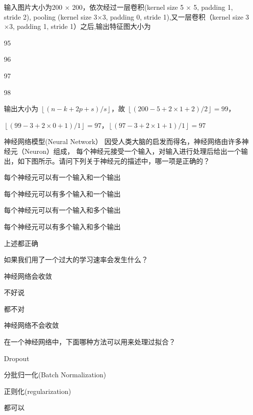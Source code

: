 \documentclass{exam-zh}
\begin{document}
\begin{question}
	输入图片大小为200 $\times$ 200，依次经过一层卷积(kernel size 5 $\times$ 5, padding 1, stride 2), pooling (kernel size 3$\times$3, padding 0, stride 1),又一层卷积（kernel size 3$\times$3, padding 1, stride 1）之后,输出特征图大小为 \paren[C]
  	\begin{choices}
		\item 95
		\item 96
		\item 97
		\item 98
	\end{choices}
	\begin{solution}
		输出大小为 $\left \lfloor (n - k + 2p + s) / s \right \rfloor $，故 $\left \lfloor (200 - 5 + 2 \times 1 + 2) / 2 \right \rfloor = 99$，
		
		$\left \lfloor (99 - 3 + 2 \times 0 + 1) / 1 \right \rfloor = 97$，$\left \lfloor (97 - 3 + 2 \times 1 + 1) / 1 \right \rfloor = 97$
	\end{solution}
\end{question}

\begin{question}
	神经网络模型(Neural Network） 因受人类大脑的启发而得名，神经网络由许多神经元（Neuron）组成， 每个神经元接受一个输入，对输入进行处理后给出一个输出，如下图所示。请问下列关于神经元的描述中，哪一项是正确的？ \paren[E]
	\begin{choices}
		\item 每个神经元可以有一个输入和一个输出
		\item 每个神经元可以有多个输入和一个输出
		\item 每个神经元可以有一个输入和多个输出
		\item 每个神经元可以有多个输入和多个输出
		\item 上述都正确
	\end{choices}
\end{question}


\begin{question}
	如果我们用了一个过大的学习速率会发生什么？ \paren[D]
	\begin{choices}
		\item 神经网络会收敛 
		\item 不好说 
		\item 都不对 
		\item 神经网络不会收敛
	\end{choices}
\end{question}

\begin{question}
	在一个神经网络中，下面哪种方法可以用来处理过拟合？ \paren[D]
	\begin{choices}
		\item Dropout
		\item 分批归一化(Batch Normalization)
		\item 正则化(regularization)
		\item 都可以
	\end{choices}
\end{question}
\end{document}
